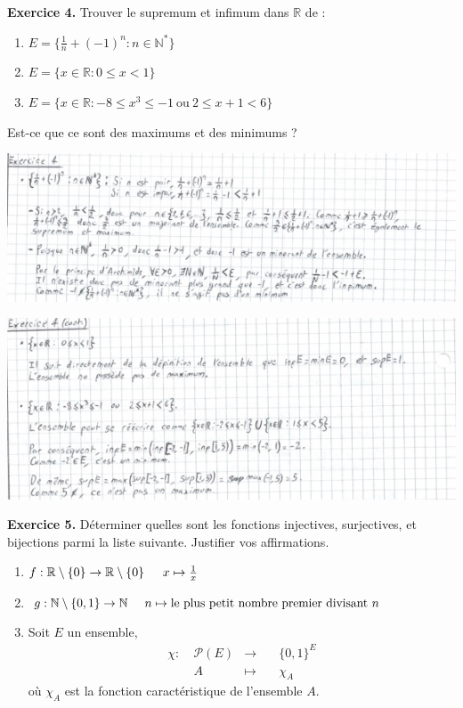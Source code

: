 \documentclass[a4paper, 10pt]{report}
\begin{document}
	\newpage
	
	\fancyhf{}
	\renewcommand{\headrule}
	{\rule{\textwidth}{0pt}}
	
	\noindent
	\textbf{Exercice 4.} Trouver le supremum et infimum dans $\mathbb{R}$
	de :
	\begin{enumerate}[label=(\roman*)]
		\item $E = \{\frac{1}{n} + (-1)^n : n \in \mathbb{N}^*\}$
		\item $E = \{x \in \mathbb{R} : 0 \leq x < 1\}$
		\item $E = \{x \in \mathbb{R} : -8 \leq x^3 \leq -1\
			\text{ou}\ 2 \leq x + 1 < 6\}$	
	\end{enumerate}
	Est-ce que ce sont des maximums et des minimums ?
	
	\includegraphics{ex04-p1.jpg}
	
	\includegraphics{ex04-p2.jpg}
	
	\vspace{5mm}
	\noindent
	\textbf{Exercice 5.} Déterminer quelles sont les fonctions
	injectives, surjectives, et bijections parmi la liste suivante.
	Justifier vos affirmations.
	\begin{enumerate}[label=(\roman*)]
		\item $f : \mathbb{R} \setminus \{0\} \to
			\mathbb{R} \setminus \{0\}\\
		\phantom{f :\ } x \mapsto \frac{1}{x}$
		\item $g : \mathbb{N} \setminus \{0, 1\} \to \mathbb{N}\\
		\phantom{g :\ } n \mapsto \text{le plus petit nombre premier
			divisant}\ n$
		\item Soit $E$ un ensemble,
		\[\begin{aligned}
			\chi :\ & \mathcal{P}(E) &\to \quad &\{0, 1\}^E\\
			&A &\mapsto \quad &\chi_A
		\end{aligned}\]
		où $\chi_A$ est la fonction caractéristique de l'ensemble $A$.
	\end{enumerate}
	
\end{document}
